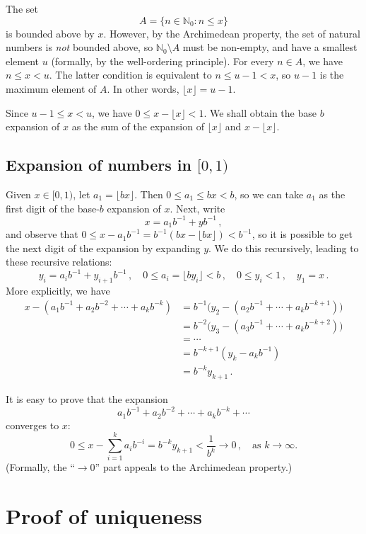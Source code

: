 \documentclass[12pt]{article}
\newcommand{\nat}{\mathbb{N}}
\begin{document}
The set
\[
A = \{ n \in \nat_0 \colon n \leq x \}
\]
is bounded above by $x$.
However, by the Archimedean 
property, the set of natural numbers is \emph{not} bounded
above, so $\nat_0 \setminus A$ must be non-empty,
and have a smallest element $u$
(formally, by the well-ordering principle).
For every $n \in A$, we have
$n \leq x < u$.
The latter condition is equivalent to $n \leq u-1 < x$,
so $u-1$ is the maximum element of $A$.
In other words, $\lfloor x \rfloor = u-1$.

Since $u-1 \leq x < u$, we have
$0 \leq x - \lfloor x \rfloor < 1$.
We shall obtain the base $b$ expansion of $x$
as the sum of the expansion of $\lfloor x \rfloor$ and
$x - \lfloor x \rfloor$.

\subsection{Expansion of numbers in $[0,1)$}
Given $x \in [0,1)$,
let $a_1 = \lfloor bx \rfloor$.
Then $0 \leq a_1 \leq bx < b$, so we can take $a_1$ as the first
digit of the base-$b$ expansion of $x$.
Next, write
\[
x = a_1 b^{-1} + yb^{-1}\,,
\]
and observe that $0 \leq x - a_1 b^{-1} = b^{-1} (bx - \lfloor bx \rfloor) < b^{-1}$,
so it is possible to get the next digit of the expansion by
expanding $y$.
We do this recursively, leading to these recursive relations:
\[
y_{i} = a_i b^{-1} + y_{i+1} b^{-1} \,, \quad 0 \leq a_i = \lfloor by_i \rfloor < b\,, \quad 0 \leq y_i < 1\,, \quad y_1 = x\,.
\]
More explicitly, we have
\begin{align*}
x - (a_1 b^{-1} + a_2 b^{-2} + \dotsb + a_k b^{-k}) &= 
b^{-1} \bigl( y_2 - (a_2 b^{-1} + \dotsb + a_k b^{-k+1}) \bigr) \\ &=
b^{-2} \bigl( y_3 - (a_3 b^{-1} + \dotsb + a_k b^{-k+2}) \bigr) \\
&= \dotsb \\
&= b^{-k+1} (y_{k} - a_k b^{-1}) \\
&= b^{-k} y_{k+1}\,.
\end{align*}

It is easy to prove that the expansion
\[
a_1 b^{-1} + a_2 b^{-2} + \dotsb + a_k b^{-k} + \dotsb
\]
converges to $x$:
\[
0 \leq x - \sum_{i=1}^k a_i b^{-i} = b^{-k} y_{k+1} < \frac{1}{b^k} \to 0\,, \quad
\text{as $k \to \infty$.}
\]
(Formally, the ``$\to 0$'' part appeals to the Archimedean property.)




\section{Proof of uniqueness}
\end{document}
